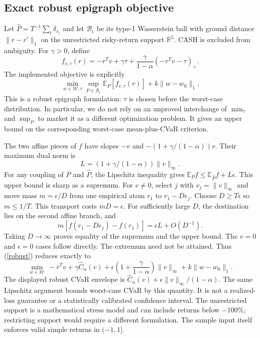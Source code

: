\documentclass[11pt,a4paper]{article}
\begin{document}
\subsection{Exact robust epigraph objective}
Let $\widehat P=T^{-1}\sum_t\delta_{r_t}$ and let $\mathcal B_\epsilon$ be its type-1 Wasserstein ball with ground distance $\|r-r'\|_1$ on the unrestricted risky-return support $\mathbb R^5$. CASH is excluded from ambiguity. For $\gamma>0$, define
\[
 f_{v,\tau}(r)=-r^Tv+\gamma\tau+
 \frac{\gamma}{1-\alpha}(-r^Tv-\tau)_+.
\]
The implemented objective is explicitly
\begin{equation}
 \min_{w\in\mathcal W,\tau}\sup_{P\in\mathcal B_\epsilon}
 \mathbb E_P[f_{v,\tau}(r)]+k\|w-w_0\|_1.\label{robust}
\end{equation}
This is a robust epigraph formulation: $\tau$ is chosen before the worst-case distribution. In particular, we do not rely on an unproved interchange of $\min_\tau$ and $\sup_P$ to market it as a different optimization problem. It gives an upper bound on the corresponding worst-case mean-plus-CVaR criterion.

The two affine pieces of $f$ have slopes $-v$ and $-(1+\gamma/(1-\alpha))v$. Their maximum dual norm is
\[
 L=(1+\gamma/(1-\alpha))\|v\|_\infty.
\]
For any coupling of $P$ and $\widehat P$, the Lipschitz inequality gives $\mathbb E_P f\leq\mathbb E_{\widehat P}f+L\epsilon$. This upper bound is sharp as a supremum. For $v\ne0$, select $j$ with $v_j=\|v\|_\infty$ and move mass $m=\epsilon/D$ from one empirical atom $r_1$ to $r_1-De_j$. Choose $D\geq T\epsilon$ so $m\leq1/T$. This transport costs $mD=\epsilon$. For sufficiently large $D$, the destination lies on the second affine branch, and
\[
 m[f(r_1-De_j)-f(r_1)]=\epsilon L+O(D^{-1}).
\]
Taking $D\to\infty$ proves equality of the supremum and the upper bound. The $v=0$ and $\epsilon=0$ cases follow directly. The extremum need not be attained. Thus (\ref{robust}) reduces exactly to
\begin{equation}
 \min_{w\in\mathcal W}\ -\bar r^Tv+\gamma\widehat C_\alpha(v)
 +\epsilon\left(1+\frac\gamma{1-\alpha}\right)\|v\|_\infty
 +k\|w-w_0\|_1.\label{finite}
\end{equation}
The displayed robust CVaR envelope is $\widehat C_\alpha(v)+\epsilon\|v\|_\infty/(1-\alpha)$. The same Lipschitz argument bounds worst-case CVaR by this quantity. It is not a realized-loss guarantee or a statistically calibrated confidence interval. The unrestricted support is a mathematical stress model and can include returns below $-100\%$; restricting support would require a different formulation. The sample input itself enforces valid simple returns in $(-1,1]$.
\end{document}
